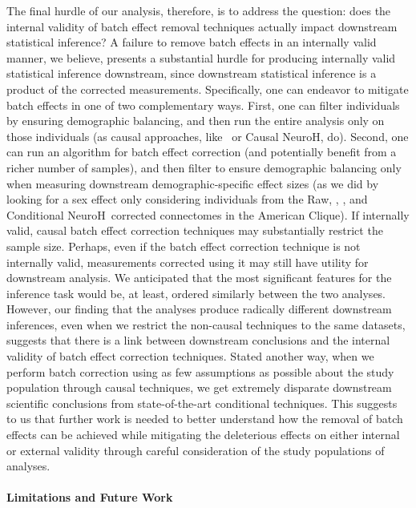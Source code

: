 The final hurdle of our analysis, therefore, is to address the question: does the internal validity of batch effect removal techniques actually impact downstream statistical inference? A failure to remove batch effects in an internally valid manner, we believe, presents a substantial hurdle for producing internally valid statistical inference downstream, since downstream statistical inference is a product of the corrected measurements. Specifically, one can  endeavor to mitigate batch effects in one of two complementary ways. First, one can filter individuals by ensuring demographic balancing, and then run the entire analysis only on those individuals (as causal approaches, like \cccombat~or Causal NeuroH, do).  Second, one can run an algorithm for batch effect correction (and potentially benefit from a richer number of samples), and then filter to ensure demographic balancing only when measuring downstream demographic-specific effect sizes (as we did by looking for a sex effect only considering individuals from the Raw, \Combat, \ccombat, and Conditional NeuroH~corrected connectomes in the American Clique). If internally valid, causal batch effect correction techniques may substantially restrict the sample size. Perhaps, even if the batch effect correction technique is not internally valid, measurements corrected using it may still have utility for downstream analysis. We anticipated that the most significant features for the inference task would be, at least, ordered similarly between the two analyses. However, our finding that the analyses produce radically different downstream inferences, even when we restrict the non-causal techniques to the same datasets, suggests that there is a link between downstream conclusions and the internal validity of batch effect correction techniques. Stated another way, when we perform batch correction using as few assumptions as possible about the study population through causal techniques, we get extremely disparate downstream scientific conclusions from state-of-the-art conditional techniques. 
This suggests to us that further work is needed to better understand how the removal of batch effects can be achieved while mitigating the deleterious effects on either internal or external validity through careful consideration of the study populations of analyses.

\paragraph*{Limitations and Future Work}

